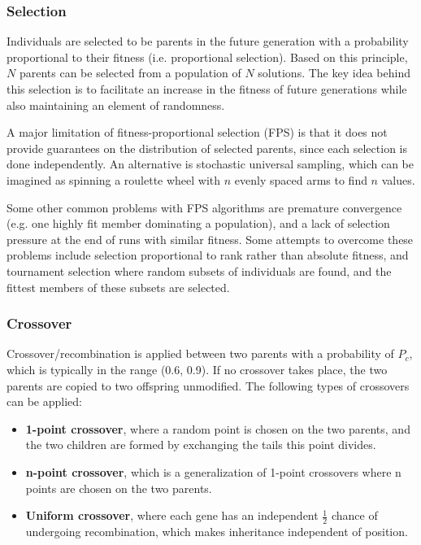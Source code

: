 \documentclass[12pt,titlepage]{article}
\begin{document}
      \subsubsection{Selection}
        Individuals are selected to be parents in the future generation with a probability proportional to their fitness (i.e. proportional selection). Based on this principle,
        $N$ parents can be selected from a population of $N$ solutions. The key idea behind this selection is to facilitate an increase in the fitness of future generations while
        also maintaining an element of randomness.

        A major limitation of fitness-proportional selection (FPS) is that it does not provide guarantees on the distribution of selected parents, since each selection is done
        independently. An alternative is stochastic universal sampling, which can be imagined as spinning a roulette wheel with $n$ evenly spaced arms to find $n$ values.

        Some other common problems with FPS algorithms are premature convergence (e.g. one highly fit member dominating a population), and a lack of selection pressure at the end
        of runs with similar fitness. Some attempts to overcome these problems include selection proportional to rank rather than absolute fitness, and tournament selection where
        random subsets of individuals are found, and the fittest members of these subsets are selected.

      \subsubsection{Crossover}
        Crossover/recombination is applied between two parents with a probability of $P_c$, which is typically in the range (0.6, 0.9). If no crossover takes place, the two parents
        are copied to two offspring unmodified. The following types of crossovers can be applied:
        \begin{itemize}
          \item \textbf{1-point crossover}, where a random point is chosen on the two parents, and the two children are formed by exchanging the tails this point divides.
          \item \textbf{n-point crossover}, which is a generalization of 1-point crossovers where n points are chosen on the two parents.
          \item \textbf{Uniform crossover}, where each gene has an independent $\frac{1}{2}$ chance of undergoing recombination, which makes inheritance independent of position.
        \end{itemize}
\end{document}
